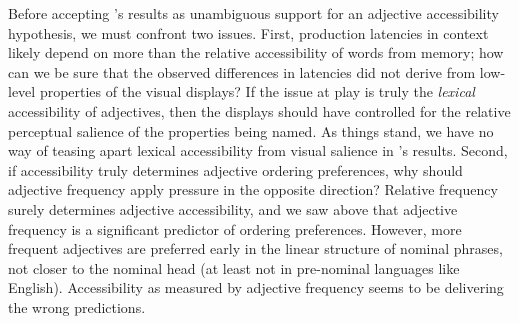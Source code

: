 \documentclass[preprint,authoryear]{elsarticle}\frenchspacing
\begin{document}
Before accepting \citeauthor{martin1969competence}'s results as unambiguous support for an adjective accessibility hypothesis, we must confront two issues. First, production latencies in context likely depend on more than the relative accessibility of words from memory; how can we be sure that the observed differences in latencies did not derive from low-level properties of the visual displays? If the issue at play is truly the \emph{lexical} accessibility of adjectives, then the displays should have controlled for the relative perceptual salience of the properties being named. As things stand, we have no way of teasing apart lexical accessibility from visual salience in \citeauthor{martin1969competence}'s results.
Second, if accessibility truly determines adjective ordering preferences, why should adjective frequency apply pressure in the opposite direction? Relative frequency surely determines adjective accessibility, and we saw above that adjective frequency is a significant predictor of ordering preferences. However, more frequent adjectives are preferred early in the linear structure of nominal phrases, not closer to the nominal head (at least not in pre-nominal languages like English). Accessibility as measured by adjective frequency seems to be delivering the wrong predictions.


\end{document}
